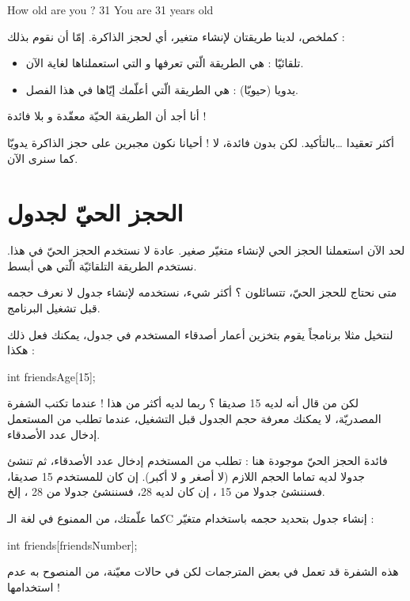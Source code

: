 \begin{Console}
How old are you ? 31
You are 31 years old
\end{Console}

كملخص، لدينا طريقتان لإنشاء متغير، أي لحجز الذاكرة. إمّا أن نقوم بذلك :
\begin{itemize}
  \item تلقائيّا : هي الطريقة الّتي تعرفها و التي استعملناها لغاية الآن.
  \item يدويا (حيويّا) : هي الطريقة الّتي أعلّمك إيّاها في هذا الفصل.
\end{itemize}

\begin{question}
أنا أجد أن الطريقة الحيّة معقّدة و بلا فائدة !
\end{question}

أكثر تعقيدا \dots بالتأكيد. لكن بدون فائدة، لا ! أحيانا نكون مجبرين على حجز الذاكرة يدويّا كما سنرى الآن.

\section{الحجز الحيّ لجدول}
لحد الآن استعملنا الحجز الحي لإنشاء متغيّر صغير. عادة لا نستخدم الحجز الحيّ في هذا. نستخدم الطريقة التلقائيّة الّتي هي أبسط.

متى نحتاج للحجز الحيّ، تتسائلون ؟ أكثر شيء، نستخدمه لإنشاء جدول لا نعرف حجمه قبل تشغيل البرنامج.

لنتخيل مثلا برنامجاً يقوم بتخزين أعمار أصدقاء المستخدم في جدول، يمكنك فعل ذلك هكذا :

\begin{Csource}
int friendsAge[15];
\end{Csource}

لكن من قال أنه لديه 15 صديقا ؟ ربما لديه أكثر من هذا !
عندما تكتب الشفرة المصدريّة، لا يمكنك معرفة حجم الجدول قبل التشغيل، عندما تطلب من المستعمل إدخال عدد الأصدقاء.

فائدة الحجز الحيّ موجودة هنا : تطلب من المستخدم إدخال عدد الأصدقاء، ثم تنشئ جدولا لديه تماما الحجم اللازم (لا أصغر و لا أكبر). إن كان للمستخدم 15 صديقا، فسننشئ جدولا من 15
،
إن كان لديه 28، فسننشئ جدولا من 28
،
إلخ.

كما علّمتك، من الممنوع في لغة الـ\textenglish{C}
إنشاء جدول بتحديد حجمه باستخدام متغيّر :

\begin{Csource}
int friends[friendsNumber];
\end{Csource}

\begin{information}
هذه الشفرة قد تعمل في بعض المترجمات لكن في حالات معيّنة، من المنصوح به عدم استخدامها !
\end{information}

